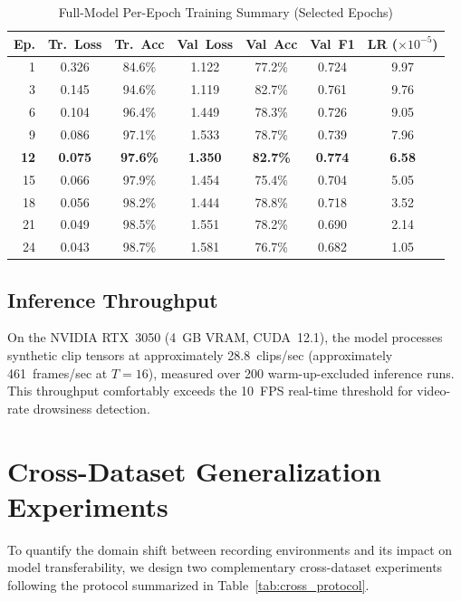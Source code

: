 \documentclass[journal]{IEEEtran}
\begin{document}
\begin{table}[t]
  \caption{Full-Model Per-Epoch Training Summary (Selected Epochs)}
  \label{tab:epoch_detail}
  \centering
  \small
  \setlength{\tabcolsep}{3pt}
  \begin{tabular}{rcccccc}
    \toprule
    Ep. & Tr.~Loss & Tr.~Acc & Val~Loss & Val~Acc & Val~F1 & LR ($\times10^{-5}$) \\
    \midrule
    1  & 0.326 & 84.6\% & 1.122 & 77.2\% & 0.724 & 9.97 \\
    3  & 0.145 & 94.6\% & 1.119 & 82.7\% & 0.761 & 9.76 \\
    6  & 0.104 & 96.4\% & 1.449 & 78.3\% & 0.726 & 9.05 \\
    9  & 0.086 & 97.1\% & 1.533 & 78.7\% & 0.739 & 7.96 \\
    \textbf{12} & \textbf{0.075} & \textbf{97.6\%} & \textbf{1.350} & \textbf{82.7\%} & \textbf{0.774} & \textbf{6.58} \\
    15 & 0.066 & 97.9\% & 1.454 & 75.4\% & 0.704 & 5.05 \\
    18 & 0.056 & 98.2\% & 1.444 & 78.8\% & 0.718 & 3.52 \\
    21 & 0.049 & 98.5\% & 1.551 & 78.2\% & 0.690 & 2.14 \\
    24 & 0.043 & 98.7\% & 1.581 & 76.7\% & 0.682 & 1.05 \\
    \bottomrule
  \end{tabular}
\end{table}


\subsection{Inference Throughput}
\label{sec:throughput}

On the NVIDIA RTX~3050 (4~GB VRAM, CUDA~12.1), the model processes synthetic clip tensors at approximately 28.8~clips/sec (approximately 461~frames/sec at $T{=}16$), measured over 200 warm-up-excluded inference runs. This throughput comfortably exceeds the 10~FPS real-time threshold for video-rate drowsiness detection.

\section{Cross-Dataset Generalization Experiments}
\label{sec:cross}

To quantify the domain shift between recording environments and its impact on model transferability, we design two complementary cross-dataset experiments following the protocol summarized in Table~\ref{tab:cross_protocol}.
\end{document}
